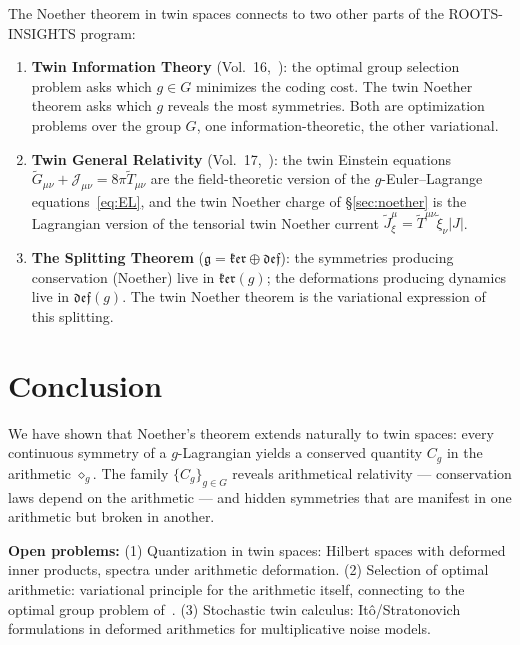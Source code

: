 \documentclass[11pt,twocolumn]{article}
\theoremstyle{plain}
\theoremstyle{definition}
\theoremstyle{remark}
\begin{document}
The Noether theorem in twin spaces connects to two other parts of the ROOTS-INSIGHTS program:

\begin{enumerate}
    \item \textbf{Twin Information Theory} (Vol.~16,~\cite{nembe2026vol16}): the optimal group selection problem asks which $g \in G$ minimizes the coding cost. The twin Noether theorem asks which $g$ reveals the most symmetries. Both are optimization problems over the group $G$, one information-theoretic, the other variational.
    
    \item \textbf{Twin General Relativity} (Vol.~17,~\cite{nembe2026vol17}): the twin Einstein equations $\tilde{G}_{\mu\nu} + \mathcal{J}_{\mu\nu} = 8\pi\tilde{T}_{\mu\nu}$ are the field-theoretic version of the $g$-Euler--Lagrange equations~\eqref{eq:EL}, and the twin Noether charge of \S\ref{sec:noether} is the Lagrangian version of the tensorial twin Noether current $\tilde{J}^\mu_\xi = \tilde{T}^{\mu\nu}\tilde{\xi}_\nu |J|$.
    
    \item \textbf{The Splitting Theorem} ($\mathfrak{g} = \mathfrak{ker} \oplus \mathfrak{def}$): the symmetries producing conservation (Noether) live in $\mathfrak{ker}(g)$; the deformations producing dynamics live in $\mathfrak{def}(g)$. The twin Noether theorem is the variational expression of this splitting.
\end{enumerate}


\section{Conclusion}
\label{sec:conclusion}

We have shown that Noether's theorem extends naturally to twin spaces: every continuous symmetry of a $g$-Lagrangian yields a conserved quantity $C_g$ in the arithmetic $\diamond_g$. The family $\{C_g\}_{g \in G}$ reveals arithmetical relativity --- conservation laws depend on the arithmetic --- and hidden symmetries that are manifest in one arithmetic but broken in another.

\textbf{Open problems:} (1) Quantization in twin spaces: Hilbert spaces with deformed inner products, spectra under arithmetic deformation. (2) Selection of optimal arithmetic: variational principle for the arithmetic itself, connecting to the optimal group problem of~\cite{nembe2026vol16}. (3) Stochastic twin calculus: Itô/Stratonovich formulations in deformed arithmetics for multiplicative noise models.
\end{document}

